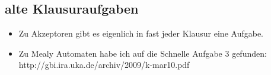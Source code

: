 \documentclass[12pt]{article}
\theoremstyle{margin}
\theoremstyle{margin}
\begin{document}
\subsection{alte Klausuraufgaben}
  \begin{itemize}
   \item Zu Akzeptoren gibt es eigenlich in fast jeder Klausur eine Aufgabe.
   \item Zu Mealy Automaten habe ich auf die Schnelle Aufgabe 3 gefunden:\\
    http://gbi.ira.uka.de/archiv/2009/k-mar10.pdf
  \end{itemize}
\end{document}
